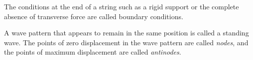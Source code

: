 \documentclass[nobib,notoc]{tufte-handout}
\begin{document}
\begin{defi}
	The conditions at the end of a string such as a rigid support or the complete absence of transverse force are called boundary conditions.
\end{defi}
\begin{defi}
	A wave pattern that appears to remain in the same position is called a standing wave. The points of zero displacement in the wave pattern are called \emph{nodes}, and the points of maximum displacement are called \emph{antinodes}.
\end{defi}
\end{document}
